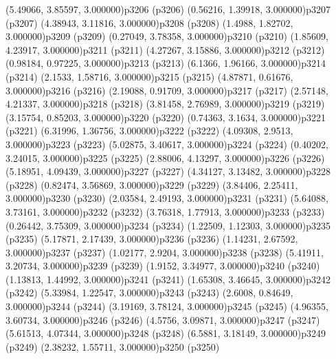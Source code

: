 \psPoint(5.49066, 3.85597, 3.000000){p3206}
\psdot(p3206)
\psPoint(0.56216, 1.39918, 3.000000){p3207}
\psdot(p3207)
\psPoint(4.38943, 3.11816, 3.000000){p3208}
\psdot(p3208)
\psPoint(1.4988, 1.82702, 3.000000){p3209}
\psdot(p3209)
\psPoint(0.27049, 3.78358, 3.000000){p3210}
\psdot(p3210)
\psPoint(1.85609, 4.23917, 3.000000){p3211}
\psdot(p3211)
\psPoint(4.27267, 3.15886, 3.000000){p3212}
\psdot(p3212)
\psPoint(0.98184, 0.97225, 3.000000){p3213}
\psdot(p3213)
\psPoint(6.1366, 1.96166, 3.000000){p3214}
\psdot(p3214)
\psPoint(2.1533, 1.58716, 3.000000){p3215}
\psdot(p3215)
\psPoint(4.87871, 0.61676, 3.000000){p3216}
\psdot(p3216)
\psPoint(2.19088, 0.91709, 3.000000){p3217}
\psdot(p3217)
\psPoint(2.57148, 4.21337, 3.000000){p3218}
\psdot(p3218)
\psPoint(3.81458, 2.76989, 3.000000){p3219}
\psdot(p3219)
\psPoint(3.15754, 0.85203, 3.000000){p3220}
\psdot(p3220)
\psPoint(0.74363, 3.1634, 3.000000){p3221}
\psdot(p3221)
\psPoint(6.31996, 1.36756, 3.000000){p3222}
\psdot(p3222)
\psPoint(4.09308, 2.9513, 3.000000){p3223}
\psdot(p3223)
\psPoint(5.02875, 3.40617, 3.000000){p3224}
\psdot(p3224)
\psPoint(0.40202, 3.24015, 3.000000){p3225}
\psdot(p3225)
\psPoint(2.88006, 4.13297, 3.000000){p3226}
\psdot(p3226)
\psPoint(5.18951, 4.09439, 3.000000){p3227}
\psdot(p3227)
\psPoint(4.34127, 3.13482, 3.000000){p3228}
\psdot(p3228)
\psPoint(0.82474, 3.56869, 3.000000){p3229}
\psdot(p3229)
\psPoint(3.84406, 2.25411, 3.000000){p3230}
\psdot(p3230)
\psPoint(2.03584, 2.49193, 3.000000){p3231}
\psdot(p3231)
\psPoint(5.64088, 3.73161, 3.000000){p3232}
\psdot(p3232)
\psPoint(3.76318, 1.77913, 3.000000){p3233}
\psdot(p3233)
\psPoint(0.26442, 3.75309, 3.000000){p3234}
\psdot(p3234)
\psPoint(1.22509, 1.12303, 3.000000){p3235}
\psdot(p3235)
\psPoint(5.17871, 2.17439, 3.000000){p3236}
\psdot(p3236)
\psPoint(1.14231, 2.67592, 3.000000){p3237}
\psdot(p3237)
\psPoint(1.02177, 2.9204, 3.000000){p3238}
\psdot(p3238)
\psPoint(5.41911, 3.20734, 3.000000){p3239}
\psdot(p3239)
\psPoint(1.9152, 3.34977, 3.000000){p3240}
\psdot(p3240)
\psPoint(1.13813, 1.44992, 3.000000){p3241}
\psdot(p3241)
\psPoint(1.65308, 3.46645, 3.000000){p3242}
\psdot(p3242)
\psPoint(5.33984, 1.22547, 3.000000){p3243}
\psdot(p3243)
\psPoint(2.6008, 0.84649, 3.000000){p3244}
\psdot(p3244)
\psPoint(3.19169, 3.78124, 3.000000){p3245}
\psdot(p3245)
\psPoint(4.96355, 3.60734, 3.000000){p3246}
\psdot(p3246)
\psPoint(4.5756, 3.09871, 3.000000){p3247}
\psdot(p3247)
\psPoint(5.61513, 4.07344, 3.000000){p3248}
\psdot(p3248)
\psPoint(6.5881, 3.18149, 3.000000){p3249}
\psdot(p3249)
\psPoint(2.38232, 1.55711, 3.000000){p3250}
\psdot(p3250)
